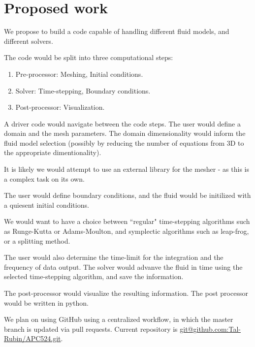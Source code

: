 \section{Proposed work}

We propose to build a code capable of handling different fluid models, and different solvers.

The code would be split into three computational steps: 
\noindent
\begin{enumerate}
\item Pre-processor: \newline
Meshing, Initial conditions.
\item Solver: \newline
Time-stepping, Boundary conditions.
\item Post-processor: \newline
Visualization.
\end{enumerate}

A driver code would navigate between the code steps. The user would define a domain and the mesh parameters. The domain dimensionality would inform the fluid model selection (possibly by reducing the number of equations from 3D to the appropriate dimentionality).

It is likely we would attempt to use an external library for the mesher - as this is a complex task on its own. 


The user would define boundary conditions, and the fluid would be initilized with a quiesent initial conditions.

We would want to have a choice between ``regular" time-stepping algorithms such as Runge-Kutta or Adams-Moulton, and symplectic algorithms such as leap-frog, or a splitting method.

The user would also determine the time-limit for the integration and the frequency of data output. The solver would advanve the fluid in time using the selected time-stepping algorithm, and save the information.

The post-processor would visualize the resulting information. The post processor would be written in python.


We plan on using GitHub using a centralized workflow, in which the master branch is updated via pull requests. Current repository is \href{git@github.com:Tal-Rubin/APC524.git}{git@github.com:Tal-Rubin/APC524.git}.


